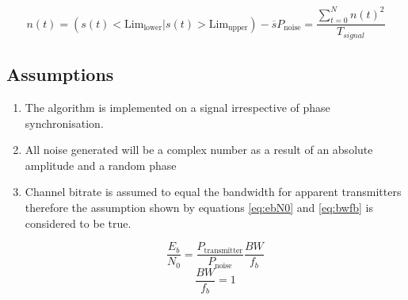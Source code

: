 \begin{multicols}{2}
\begin{subequations}
\begin{equation}
    n(t) = (s(t) < \text{Lim}_{\text{lower}} | s(t) > \text{Lim}_{\text{upper}}) - \overline{s}
    \label{eq:noiseest}
\end{equation}
\begin{equation}
    P_{\text{noise}} = \frac{\sum_{t=0}^{N} n(t)^2}{T_{signal}}
    \label{eq:pnoise}
\end{equation}
\end{subequations}
\end{multicols}

\subsection{Assumptions}
\begin{enumerate}
    \item The algorithm is implemented on a signal irrespective of phase synchronisation.
    \item All noise generated will be a complex number as a result of an absolute amplitude and a random phase
    \item Channel bitrate is assumed to equal the bandwidth for apparent transmitters therefore the assumption shown by equations \ref{eq:ebN0} and  \ref{eq:bwfb} is considered to be true.
    \begin{multicols}{2}
    \begin{equation}
        \frac{E_b}{N_0} =  \frac{P_{\text{transmitter}}}{P_{\text{noise}}} \frac{BW}{f_b}
        \label{eq:ebN0}
    \end{equation}
    \begin{equation}
    \frac{BW}{f_b} = 1
    \label{eq:bwfb}
    \end{equation}
    \end{multicols}
\end{enumerate}
